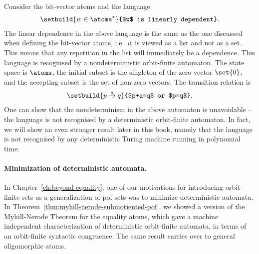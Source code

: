 \begin{myexample}\label{ex:linearly-dependent-automaton}
	Consider the bit-vector atoms and the language 
	\begin{align*}
	\setbuild{ w \in \atoms^*}{$w$ is linearly dependent}.
	\end{align*}
	The linear dependence in the above language is the same as the one discussed when defining the bit-vector atoms, i.e.~$w$ is viewed as a list and not as a set. This means that any repetition in the list will immediately be a dependence. This language is recognised by a nondeterministic orbit-finite automaton. The state space is $\atoms$, the initial subset is the singleton of the zero vector $\set{0}$, and the accepting subset is the set of  non-zero vectors. The transition relation is 
	\begin{align*}
	\setbuild{ p \stackrel a \to q}{$p+a=q$ or $p=q$}.
	\end{align*}
	One can show that the nondeterminism in the above automaton is unavoidable -- the  language is not recognised by a deterministic orbit-finite automaton. In fact, we will show an even stronger result later in this book, namely that the language is not recognised by any deterministic Turing machine running in polynomial time.
\end{myexample}
 














\paragraph*{Minimization of deterministic automata.} In Chapter~\ref{ch:beyond-equality}, one of our motivations for introducing orbit-finite sets as a generalization of pof sets was to minimize deterministic automata. In Theorem~\ref{thm:myhill-nerode-submotiented-pof}, we showed a version of the Myhill-Nerode Theorem for the equality atoms, which gave a machine independent characterization of deterministic orbit-finite automata, in terms of an orbit-finite syntactic congruence. The same result carries over to general oligomorphic atoms.


